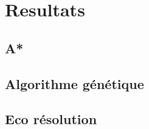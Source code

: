 \chapter{Resultats}
    \section{A*}
    \section{Algorithme génétique}
    \section{Eco résolution}
